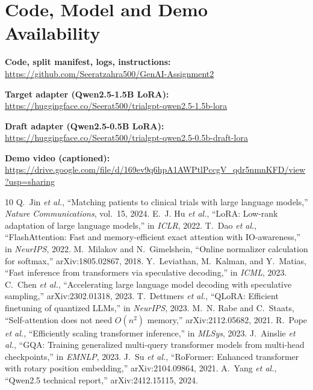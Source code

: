 \documentclass[conference]{IEEEtran}
\begin{document}
\section{Code, Model and Demo Availability}
\begin{flushleft}\footnotesize\setlength{\parindent}{0pt}\sloppy
\textbf{Code, split manifest, logs, instructions:}\\ \url{https://github.com/Seeratzahra500/GenAI-Assignment2}\par\smallskip
\textbf{Target adapter (Qwen2.5-1.5B LoRA):}\\ \url{https://huggingface.co/Seerat500/trialgpt-qwen2.5-1.5b-lora}\par\smallskip
\textbf{Draft adapter (Qwen2.5-0.5B LoRA):}\\ \url{https://huggingface.co/Seerat500/trialgpt-qwen2.5-0.5b-draft-lora}\par\smallskip
\textbf{Demo video (captioned):}\\ \url{https://drive.google.com/file/d/169ev9q6hpA1AWPtlPccgV_qdr5nmnKFD/view?usp=sharing}
\end{flushleft}

\begin{thebibliography}{10}
 Q.~Jin \emph{et al.}, ``Matching patients to clinical trials with large language models,'' \emph{Nature Communications}, vol.~15, 2024.
 E.~J. Hu \emph{et al.}, ``LoRA: Low-rank adaptation of large language models,'' in \emph{ICLR}, 2022.
 T.~Dao \emph{et al.}, ``FlashAttention: Fast and memory-efficient exact attention with IO-awareness,'' in \emph{NeurIPS}, 2022.
 M.~Milakov and N.~Gimelshein, ``Online normalizer calculation for softmax,'' arXiv:1805.02867, 2018.
 Y.~Leviathan, M.~Kalman, and Y.~Matias, ``Fast inference from transformers via speculative decoding,'' in \emph{ICML}, 2023.
 C.~Chen \emph{et al.}, ``Accelerating large language model decoding with speculative sampling,'' arXiv:2302.01318, 2023.
 T.~Dettmers \emph{et al.}, ``QLoRA: Efficient finetuning of quantized LLMs,'' in \emph{NeurIPS}, 2023.
 M.~N. Rabe and C.~Staats, ``Self-attention does not need $O(n^2)$ memory,'' arXiv:2112.05682, 2021.
 R.~Pope \emph{et al.}, ``Efficiently scaling transformer inference,'' in \emph{MLSys}, 2023.
 J.~Ainslie \emph{et al.}, ``GQA: Training generalized multi-query transformer models from multi-head checkpoints,'' in \emph{EMNLP}, 2023.
 J.~Su \emph{et al.}, ``RoFormer: Enhanced transformer with rotary position embedding,'' arXiv:2104.09864, 2021.
 A.~Yang \emph{et al.}, ``Qwen2.5 technical report,'' arXiv:2412.15115, 2024.
\end{thebibliography}
\end{document}
